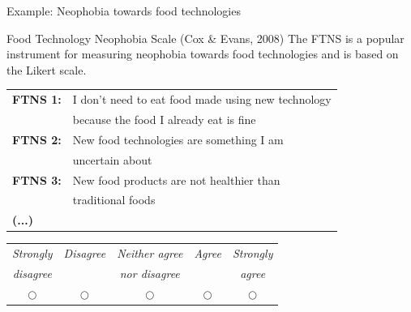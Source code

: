 \documentclass{beamer}
\begin{document}
\begin{frame}{Example: Neophobia towards food technologies}
  \begin{block}{Food Technology Neophobia Scale (Cox \& Evans, 2008)}
    The FTNS is a popular instrument for measuring neophobia towards food technologies and is based on the Likert scale.
  \end{block}
  \vspace{0.3cm}
  \small
  \begin{tabular}{l l}
    \textbf{FTNS 1:} & I don't need to eat food made using new technology \\
    & because the food I already eat is fine \\
    \textbf{FTNS 2:} & New food technologies are something I am \\
    & uncertain about \\
    \textbf{FTNS 3:} & New food products are not healthier than \\
    & traditional foods \\
    \textbf{(...)}
  \end{tabular}
  \vspace{0.2cm}
  \begin{center}
    \footnotesize
    \begin{tabular}{ccccc}
      \toprule
      \textit{Strongly} & \textit{Disagree} & \textit{Neither agree} & \textit{Agree} & \textit{Strongly} \\
      \textit{disagree} &  & \textit{nor disagree} &  & \textit{agree} \\
      \midrule
      $\bigcirc$ & $\bigcirc$ & $\bigcirc$ & $\bigcirc$ & $\bigcirc$ \\
      \bottomrule
    \end{tabular}
  \end{center}
\end{frame}
\end{document}
